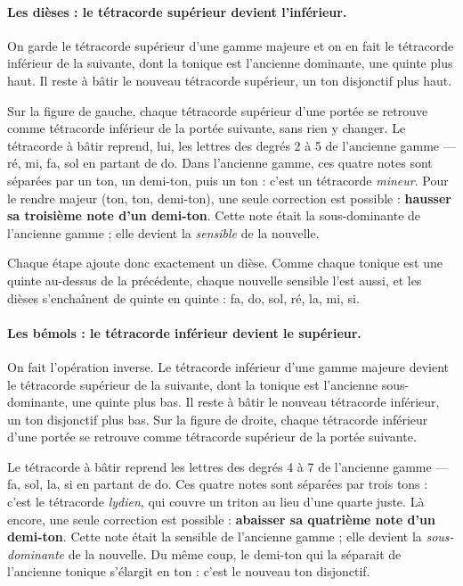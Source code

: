 \documentclass[a4paper,11pt]{article}
\begin{document}
\paragraph{Les dièses : le tétracorde supérieur devient l'inférieur.}
On garde le tétracorde supérieur d'une gamme majeure et on en fait le
tétracorde inférieur de la suivante, dont la tonique est l'ancienne
dominante, une quinte plus haut. Il reste à bâtir le nouveau tétracorde
supérieur, un ton disjonctif plus haut.

Sur la figure de gauche, chaque tétracorde supérieur d'une portée se
retrouve comme tétracorde inférieur de la portée suivante, sans rien y
changer. Le tétracorde à bâtir
reprend, lui, les lettres des degrés 2 à 5 de l'ancienne gamme — ré, mi, fa,
sol en partant de do. Dans l'ancienne gamme, ces quatre notes sont séparées
par un ton, un demi-ton, puis un ton : c'est un tétracorde \emph{mineur}.
Pour le rendre majeur (ton, ton, demi-ton), une seule correction est
possible : \textbf{hausser sa troisième note d'un demi-ton}. Cette note était
la sous-dominante de l'ancienne gamme ; elle devient la \emph{sensible} de
la nouvelle.

Chaque étape ajoute donc exactement un dièse. Comme chaque tonique est une
quinte au-dessus de la précédente, chaque nouvelle sensible l'est aussi, et
les dièses s'enchaînent de quinte en quinte : fa, do, sol, ré, la, mi, si.

\paragraph{Les bémols : le tétracorde inférieur devient le supérieur.}
On fait l'opération inverse. Le tétracorde inférieur d'une gamme majeure
devient le tétracorde supérieur de la suivante, dont la tonique est
l'ancienne sous-dominante, une quinte plus bas. Il reste à bâtir le nouveau
tétracorde inférieur, un ton disjonctif plus bas. Sur la figure de droite,
chaque tétracorde inférieur d'une portée se retrouve comme tétracorde
supérieur de la portée suivante.

Le tétracorde à bâtir reprend les lettres des degrés 4 à 7 de l'ancienne
gamme — fa, sol, la, si en partant de do. Ces quatre notes sont séparées par
trois tons : c'est le tétracorde \emph{lydien}, qui couvre un triton au lieu
d'une quarte juste. Là encore, une seule correction est possible :
\textbf{abaisser sa quatrième note d'un demi-ton}. Cette note était la
sensible de l'ancienne gamme ; elle devient la \emph{sous-dominante} de la
nouvelle. Du même coup, le demi-ton qui la séparait de l'ancienne tonique
s'élargit en ton : c'est le nouveau ton disjonctif.
\end{document}
